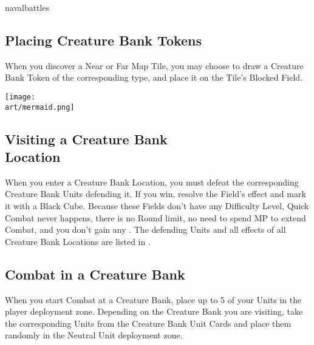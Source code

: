 \begin{expansion}[before=\vspace*{-11mm}]{navalbattles}
\begin{multicols*}{2}
  \subsection*{Placing Creature Bank Tokens}
  When you discover a Near or Far Map Tile, you may choose to draw a Creature Bank Token of the corresponding type, and place it on the Tile's Blocked Field.\par

  \begin{center}
    \texttt{[image: \\art/mermaid.png]}
  \end{center}
  \columnbreak

  \subsection*{Visiting a Creature Bank\\Location}
  When you enter a Creature Bank Location, you must defeat the corresponding Creature Bank Units defending it.
  If you win, resolve the Field's effect and mark it with a Black Cube.
  Because these Fields don't have any Difficulty Level, Quick Combat never happens, there is no Round limit, no need to spend MP to extend Combat, and you don't gain any .
  The defending Units and all effects of all Creature Bank Locations are listed in .

  \subsection*{Combat in a Creature Bank}
  When you start Combat at a Creature Bank, place up to 5 of your Units in the player deployment zone.
  Depending on the Creature Bank you are visiting, take the corresponding Units from the Creature Bank Unit Cards and place them randomly in the Neutral Unit deployment zone.


\end{multicols*}
\end{expansion}
